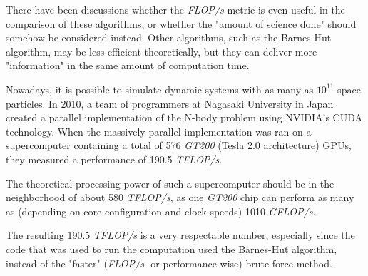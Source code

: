 \documentclass[journal]{IEEEtran}
\begin{document}
		There have been discussions whether the \textit{FLOP/s} metric is even useful in the comparison of these algorithms, or whether the "amount of science done" should somehow be considered instead. Other algorithms, such as the Barnes-Hut algorithm, may be less efficient theoretically, but they can deliver more "information" in the same amount of computation time.
		
		Nowadays, it is possible to simulate dynamic systems with as many as $10^{11}$ space particles. In 2010, a team of programmers at Nagasaki University in Japan created a parallel implementation of the N-body problem using NVIDIA’s CUDA technology. When the massively parallel implementation was ran on a supercomputer containing a total of 576 \textit{GT200} (Tesla 2.0 architecture) GPUs, they measured a performance of 190.5 \textit{TFLOP/s}. \cite{teraflops}
		
		The theoretical processing power of such a supercomputer should be in the neighborhood of about 580 \textit{TFLOP/s}, as one \textit{GT200} chip can perform as many as (depending on core configuration and clock speeds) 1010 \textit{GFLOP/s}.\cite{wikitesla}
		
		The resulting 190.5 \textit{TFLOP/s} is a very respectable number, especially since the code that was used to run the computation used the Barnes-Hut algorithm, instead of the "faster" (\textit{FLOP/s}- or performance-wise) brute-force method.
		
		
\end{document}
